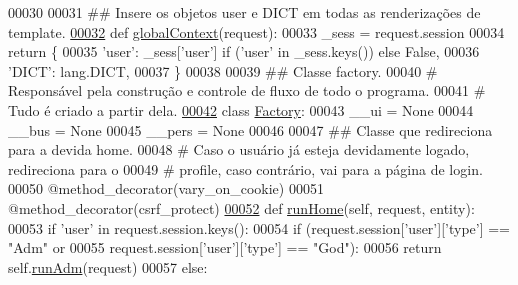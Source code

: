 \begin{DoxyCode}
00030 
00031 \textcolor{comment}{## Insere os objetos user e DICT em todas as renderizações de template.}
\hypertarget{MainUnit_8py_source_l00032}{}\hyperlink{namespaceELO_1_1MainUnit_a9a93b85d475fc34f726b09b8649be247}{00032} \textcolor{keyword}{def }\hyperlink{namespaceELO_1_1MainUnit_a9a93b85d475fc34f726b09b8649be247}{globalContext}(request):
00033     \_sess = request.session
00034     \textcolor{keywordflow}{return} \{
00035             \textcolor{stringliteral}{'user'}: \_sess[\textcolor{stringliteral}{'user'}] \textcolor{keywordflow}{if} (\textcolor{stringliteral}{'user'} \textcolor{keywordflow}{in} \_sess.keys()) \textcolor{keywordflow}{else} \textcolor{keyword}{False},
00036             \textcolor{stringliteral}{'DICT'}: lang.DICT,
00037         \}
00038 
00039 \textcolor{comment}{## Classe factory.}
00040 \textcolor{comment}{#   Responsável pela construção e controle de fluxo de todo o programa. }
00041 \textcolor{comment}{#   Tudo é criado a partir dela.}
\hypertarget{MainUnit_8py_source_l00042}{}\hyperlink{classELO_1_1MainUnit_1_1Factory}{00042} \textcolor{keyword}{class }\hyperlink{classELO_1_1MainUnit_1_1Factory}{Factory}:
00043     \_\_ui = \textcolor{keywordtype}{None}
00044     \_\_bus = \textcolor{keywordtype}{None}
00045     \_\_pers = \textcolor{keywordtype}{None}
00046 
00047     \textcolor{comment}{## Classe que redireciona para a devida home.}
00048     \textcolor{comment}{#   Caso o usuário já esteja devidamente logado, redireciona para o}
00049     \textcolor{comment}{#   profile, caso contrário, vai para a página de login.}
00050     @method\_decorator(vary\_on\_cookie)
00051     @method\_decorator(csrf\_protect)
\hypertarget{MainUnit_8py_source_l00052}{}\hyperlink{classELO_1_1MainUnit_1_1Factory_abb90458d8f89dd0fbfefcab94e9f023f}{00052}     \textcolor{keyword}{def }\hyperlink{classELO_1_1MainUnit_1_1Factory_abb90458d8f89dd0fbfefcab94e9f023f}{runHome}(self, request, entity):
00053         \textcolor{keywordflow}{if} \textcolor{stringliteral}{'user'} \textcolor{keywordflow}{in} request.session.keys():
00054             \textcolor{keywordflow}{if} (request.session[\textcolor{stringliteral}{'user'}][\textcolor{stringliteral}{'type'}] == \textcolor{stringliteral}{"Adm"} \textcolor{keywordflow}{or} 
00055                request.session[\textcolor{stringliteral}{'user'}][\textcolor{stringliteral}{'type'}] == \textcolor{stringliteral}{"God"}):
00056                 \textcolor{keywordflow}{return} self.\hyperlink{classELO_1_1MainUnit_1_1Factory_a533b402a54bf6f6715824a8687fa7a24}{runAdm}(request)
00057             \textcolor{keywordflow}{else}:

\end{DoxyCode}
